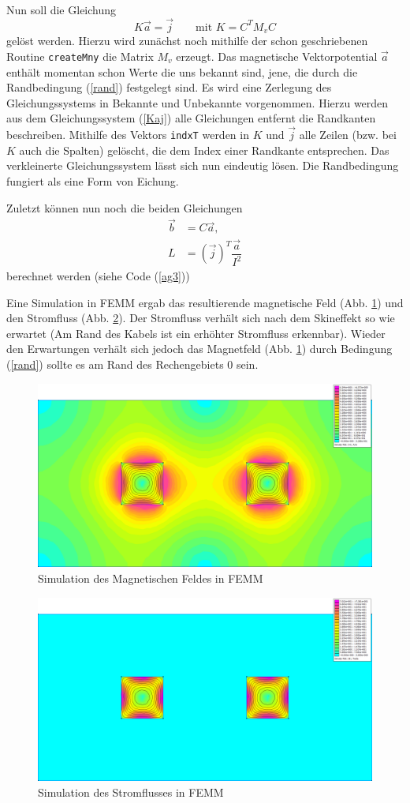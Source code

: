 Nun soll die Gleichung
\begin{equation}
\label{Kaj}
	K\vec{a} = \vec{j} \qquad \text{mit } K = C^TM_vC
\end{equation}
gelöst werden. Hierzu wird zunächst noch mithilfe der schon geschriebenen Routine \texttt{createMny} die Matrix $M_v$ erzeugt. Das magnetische Vektorpotential $\vec{a}$ enthält momentan schon Werte die uns bekannt sind, jene, die durch die Randbedingung (\ref{rand}) festgelegt sind. Es wird eine Zerlegung des Gleichungssystems in Bekannte und Unbekannte vorgenommen. Hierzu werden aus dem Gleichungssystem (\ref{Kaj}) alle Gleichungen entfernt die Randkanten beschreiben. Mithilfe des Vektors \texttt{indxT} werden in $K$ und $\vec{j}$ alle Zeilen (bzw. bei $K$ auch die Spalten) gelöscht, die dem Index einer Randkante entsprechen. Das verkleinerte Gleichungssystem lässt sich nun eindeutig lösen. Die Randbedingung fungiert als eine Form von Eichung.

Zuletzt können nun noch die beiden Gleichungen
\begin{align*}
\vec{b} &= C\vec{a},\\
L &= (\vec{j})^T \dfrac{\vec{a}}{I^2}
\end{align*}
berechnet werden (siehe Code (\ref{ag3}))

Eine Simulation in FEMM ergab das resultierende magnetische Feld (Abb. \ref{fig:magnet}) und den Stromfluss (Abb. \ref{fig:strom}). Der Stromfluss verhält sich nach dem Skineffekt so wie erwartet (Am Rand des Kabels ist ein erhöhter Stromfluss erkennbar). Wieder den Erwartungen verhält sich jedoch das Magnetfeld (Abb. \ref{fig:magnet}) durch Bedingung (\ref{rand}) sollte es am Rand des Rechengebiets $0$ sein.

\begin{figure}[thbp]
	\centering
	\includegraphics[width=.68\textwidth]{data/MagnetischesFeld}
	\caption{Simulation des Magnetischen Feldes in FEMM}
	\label{fig:magnet}
\end{figure}

\begin{figure}[thbp]
	\centering
	\includegraphics[width=.68\textwidth]{data/Stromfluss}
	\caption{Simulation des Stromflusses in FEMM}
	\label{fig:strom}
\end{figure}